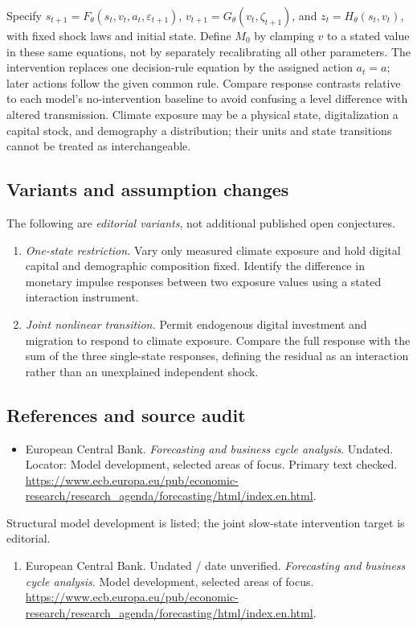 \documentclass[11pt,a4paper]{article}
\begin{document}
Specify \(s_{t+1}=F_\theta(s_t,v_t,a_t,\varepsilon_{t+1})\), \(v_{t+1}=G_\theta(v_t,\zeta_{t+1})\), and \(z_t=H_\theta(s_t,v_t)\), with fixed shock laws and initial state. Define \(M_0\) by clamping \(v\) to a stated value in these same equations, not by separately recalibrating all other parameters. The intervention replaces one decision-rule equation by the assigned action \(a_t=a\); later actions follow the given common rule. Compare response contrasts relative to each model's no-intervention baseline to avoid confusing a level difference with altered transmission. Climate exposure may be a physical state, digitalization a capital stock, and demography a distribution; their units and state transitions cannot be treated as interchangeable.
\subsection*{Variants and assumption changes}
The following are \emph{editorial variants}, not additional published open conjectures.
\begin{enumerate}
\item \emph{One-state restriction.} Vary only measured climate exposure and hold digital capital and demographic composition fixed. Identify the difference in monetary impulse responses between two exposure values using a stated interaction instrument.
\item \emph{Joint nonlinear transition.} Permit endogenous digital investment and migration to respond to climate exposure. Compare the full response with the sum of the three single-state responses, defining the residual as an interaction rather than an unexplained independent shock.
\end{enumerate}
\subsection*{References and source audit}
\begin{itemize}
\item European Central Bank. \emph{Forecasting and business cycle analysis}. Undated. Locator: Model development, selected areas of focus. Primary text checked. \url{https://www.ecb.europa.eu/pub/economic-research/research_agenda/forecasting/html/index.en.html}.
\end{itemize}
Structural model development is listed; the joint slow-state intervention target is editorial.
\begin{enumerate}\raggedright
\item\hypertarget{definitions:source:30007521:1}{} European Central Bank. Undated / date unverified. \emph{Forecasting and business cycle analysis}. Model development, selected areas of focus.
\url{https://www.ecb.europa.eu/pub/economic-research/research_agenda/forecasting/html/index.en.html}.
\end{enumerate}
\end{document}
